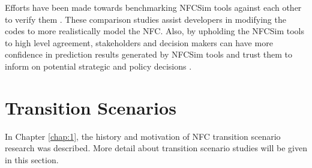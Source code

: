 Efforts have been made towards benchmarking \gls{NFCSim} 
tools against each other to verify them 
\cite{feng_standardized_2016,guerin_benchmark_2009}. 
These comparison studies assist developers in modifying the
codes to more realistically model the \gls{NFC}. 
Also, by upholding the \gls{NFCSim} tools to high level agreement, 
stakeholders and decision makers can have more confidence in 
prediction results generated by \gls{NFCSim} tools and trust them 
to inform on potential strategic and policy decisions
\cite{feng_standardized_2016}. 

\section{Transition Scenarios}
In Chapter \ref{chap:1}, the history and motivation of
\gls{NFC} transition scenario research was described.
More detail about transition scenario studies will be given 
in this section. 

